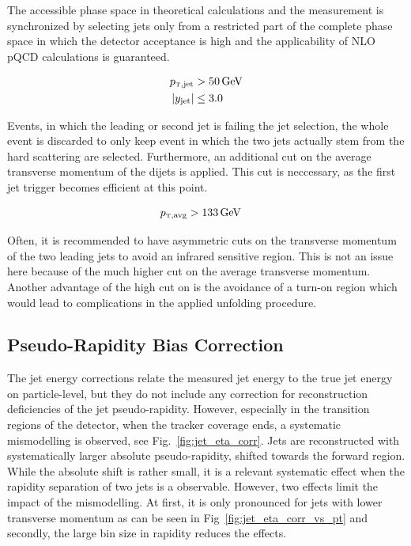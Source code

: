 The accessible phase space in theoretical calculations and the measurement is
synchronized by selecting jets only from a restricted part of the complete phase
space in which the detector acceptance is high and the applicability of NLO
pQCD calculations is guaranteed.

\begin{align*}
    \ptjet &> \SI{50}{\GeV}\\
    |y_\mathrm{jet}| &\leq 3.0\\
\end{align*}

Events, in which the leading or second jet is failing the jet selection, the
whole event is discarded to only keep event in which the two jets actually stem
from the hard scattering are selected. Furthermore, an additional cut on the
average transverse momentum of the dijets is applied. This cut is neccessary, as
the first jet trigger becomes efficient at this point.

\begin{align*}
    \ptavg &> \SI{133}{\GeV}
\end{align*}

Often, it is recommended to have asymmetric cuts on the transverse momentum of
the two leading jets to avoid an infrared sensitive region. This is not an issue
here because of the much higher cut on the average transverse momentum. Another
advantage of the high cut on \ptavg is the avoidance of a turn-on region which
would lead to complications in the applied unfolding procedure.

\subsection{Pseudo-Rapidity Bias Correction}

The jet energy corrections relate the measured jet energy to the true jet energy
on particle-level, but they do not include any correction for reconstruction
deficiencies of the jet pseudo-rapidity. However, especially in the transition
regions of the detector, \ie when the tracker coverage ends, a systematic
mismodelling is observed, see Fig.~\ref{fig:jet_eta_corr}. Jets are
reconstructed with systematically larger absolute pseudo-rapidity, \ie shifted towards
the forward region. While the absolute shift is rather small, it is a relevant
systematic effect when the rapidity separation of two jets is a observable.
However, two effects limit the impact of the mismodelling. At first, it is only
pronounced for jets with lower transverse momentum as can be seen in
Fig~\ref{fig:jet_eta_corr_vs_pt} and secondly, the large bin size in rapidity
reduces the effects. 

